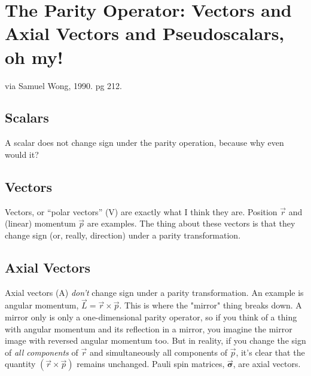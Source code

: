 
\chapter[Misc. Nuclear Physics]{The Parity Operator:  Vectors and Axial Vectors and Pseudoscalars, oh my!}

via Samuel Wong, 1990.  pg 212.

\section{Scalars}
A scalar does not change sign under the parity operation, because why even would it?

\section{Vectors}
Vectors, or ``polar vectors'' (V) are exactly what I think they are.  Position $\vec{r}$ and (linear) momentum $\vec{p}$ are examples.  The thing about these vectors is that they change sign (or, really, direction) under a parity transformation.  

\section{Axial Vectors}
Axial vectors (A) \emph{don't} change sign under a parity transformation.  An example is angular momentum, $\vec{L} = \vec{r} \times \vec{p}$.  This is where the "mirror" thing breaks down.  A mirror only is only a one-dimensional parity operator, so if you think of a thing with angular momentum and its reflection in a mirror, you imagine the mirror image with reversed angular momentum too.  But in reality, if you change the sign of \emph{all components} of $\vec{r}$ and simultaneously all components of $\vec{p}$, it's clear that the quantity $(\vec{r} \times \vec{p})$ remains unchanged.  Pauli spin matrices, $\vec{\mathbf{\sigma}}$, are axial vectors.

